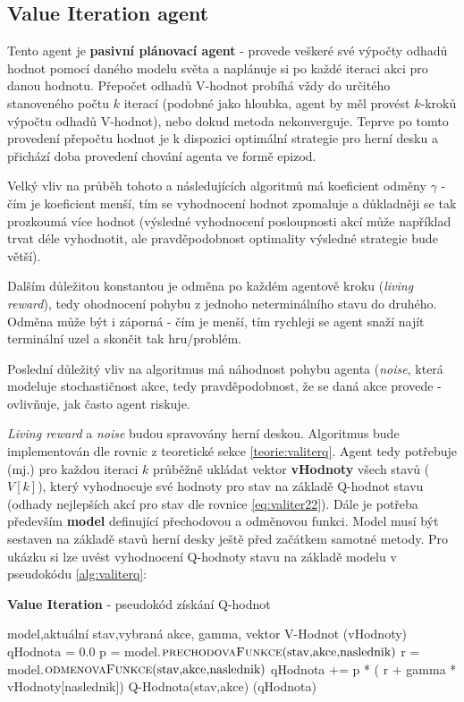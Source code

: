 \subsection{Value Iteration agent}
\label{navrh:valiteragent}
Tento agent je \textbf{pasivní plánovací agent} - provede veškeré své výpočty odhadů hodnot pomocí daného modelu světa a naplánuje si po každé iteraci akci pro danou hodnotu. Přepočet odhadů V-hodnot probíhá vždy do určitého stanoveného počtu $k$ iterací (podobné jako hloubka, agent by měl provést $k$-kroků výpočtu odhadů V-hodnot), nebo dokud metoda nekonverguje. Teprve po tomto provedení přepočtu hodnot je k dispozici optimální strategie pro herní desku a přichází doba provedení chování agenta ve formě epizod.

Velký vliv na průběh tohoto a následujících algoritmů má koeficient odměny $\gamma$ - čím je koeficient menší, tím se vyhodnocení hodnot zpomaluje a důkladněji se tak prozkoumá více hodnot (výsledné vyhodnocení posloupnosti akcí může například trvat déle vyhodnotit, ale pravděpodobnost optimality výsledné strategie bude větší).

Dalším důležitou konstantou je odměna po každém agentově kroku (\textit{living reward}), tedy ohodnocení pohybu z jednoho neterminálního stavu do druhého. Odměna může být i záporná - čím je menší, tím rychleji se agent snaží najít terminální uzel a skončit tak hru/problém. 

Poslední důležitý vliv na algoritmus má náhodnost pohybu agenta (\textit{noise}, která modeluje stochastičnost akce, tedy pravděpodobnost, že se daná akce provede - ovlivňuje, jak často agent riskuje.

\textit{Living reward} a \textit{noise} budou spravovány herní deskou.
\newline
Algoritmus bude implementován dle rovnic z teoretické sekce \ref{teorie:valiterq}. Agent tedy potřebuje (mj.) pro každou iteraci $k$ průběžně ukládat vektor \textbf{vHodnoty} všech stavů ($V\left[k\right]$), který vyhodnocuje své hodnoty pro stav na základě Q-hodnot stavu (odhady nejlepších akcí pro stav dle rovnice \ref{eq:valiter22}). Dále je potřeba především \textbf{model} definující přechodovou a odměnovou funkci. Model musí být sestaven na základě stavů herní desky ještě před začátkem samotné metody. Pro ukázku si lze uvést vyhodnocení Q-hodnoty stavu na základě modelu v pseudokódu \ref{alg:valiterq}:
 
\begin{algorithm}
\caption{\textbf{Value Iteration} - pseudokód získání Q-hodnot}
\label{alg:valiterq}
\begin{algorithmic}[1]
\Require model,aktuální stav,vybraná akce, gamma, vektor V-Hodnot (vHodnoty)
\State qHodnota = 0.0
  \State p = model.$\text{\Call{prechodovaFunkce}{stav,akce,naslednik}}$
  \State r = model.$\text{\Call{odmenovaFunkce}{stav,akce,naslednik}}$
  \State qHodnota += p * ( r + gamma * vHodnoty[naslednik])
\EndFor
\Ensure Q-Hodnota(stav,akce) (qHodnota)
\end{algorithmic}
\end{algorithm}
\newpage

